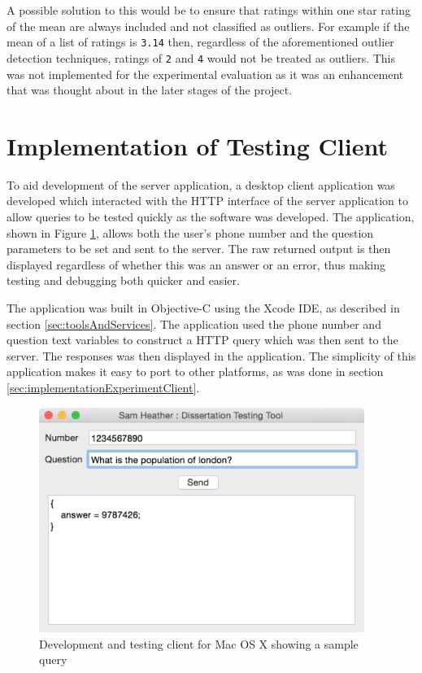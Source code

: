 \documentclass[authoryearcitations]{UoYCSproject}
\begin{document}
A possible solution to this would be to ensure that ratings within one star rating of the mean are always included and not classified as outliers. For example if the mean of a list of ratings is \texttt{3.14} then, regardless of the aforementioned outlier detection techniques, ratings of \texttt{2} and \texttt{4} would not be treated as outliers. This was not implemented for the experimental evaluation as it was an enhancement that was thought about in the later stages of the project.

\section{Implementation of Testing Client}
\label{sec:implementationTestingClient}
To aid development of the server application, a desktop client application was developed which interacted with the HTTP interface of the server application to allow queries to be tested quickly as the software was developed. The application, shown in Figure \ref{fig:devClient}, allows both the user's phone number and the question parameters to be set and sent to the server. The raw returned output is then displayed regardless of whether this was an answer or an error, thus making testing and debugging both quicker and easier. 

The application was built in Objective-C using the Xcode IDE, as described in section \ref{sec:toolsAndServices}. The application used the phone number and question text variables to construct a HTTP query which was then sent to the server. The responses was then displayed in the application. The simplicity of this application makes it easy to port to other platforms, as was done in section \ref{sec:implementationExperimentClient}.

\begin{figure}[htb]
    \centering
    \includegraphics[width=300pt]{devClient}
    \caption{Development and testing client for Mac OS X showing a sample query}
    \label{fig:devClient}
\end{figure}
\end{document}
